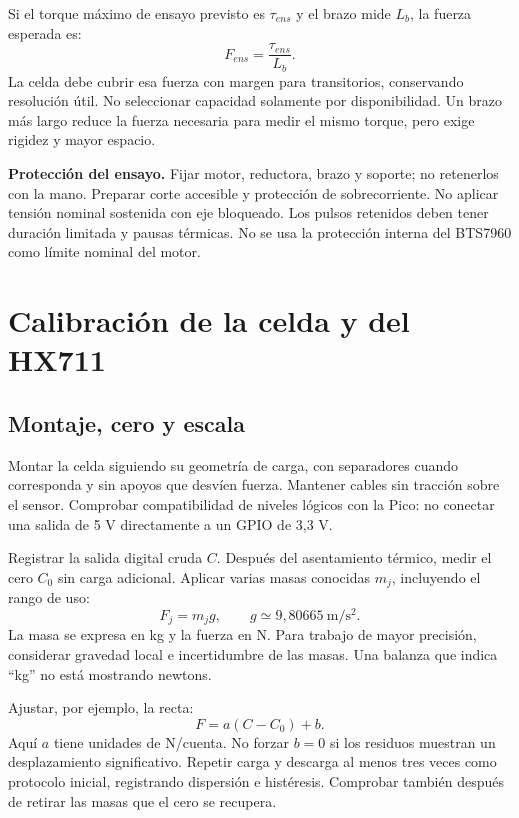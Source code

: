 \documentclass[11pt,a4paper]{article}
\begin{document}
Si el torque máximo de ensayo previsto es $\tau_{ens}$ y el brazo mide $L_b$, la fuerza esperada es:
\begin{equation}
F_{ens}=\frac{\tau_{ens}}{L_b}.
\end{equation}
La celda debe cubrir esa fuerza con margen para transitorios, conservando resolución útil. No seleccionar capacidad solamente por disponibilidad. Un brazo más largo reduce la fuerza necesaria para medir el mismo torque, pero exige rigidez y mayor espacio.

\textbf{Protección del ensayo.} Fijar motor, reductora, brazo y soporte; no retenerlos con la mano. Preparar corte accesible y protección de sobrecorriente. No aplicar tensión nominal sostenida con eje bloqueado. Los pulsos retenidos deben tener duración limitada y pausas térmicas. No se usa la protección interna del BTS7960 como límite nominal del motor.

\section{Calibración de la celda y del HX711}
\subsection{Montaje, cero y escala}
Montar la celda siguiendo su geometría de carga, con separadores cuando corresponda y sin apoyos que desvíen fuerza. Mantener cables sin tracción sobre el sensor. Comprobar compatibilidad de niveles lógicos con la Pico: no conectar una salida de 5 V directamente a un GPIO de 3,3 V.

Registrar la salida digital cruda $C$. Después del asentamiento térmico, medir el cero $C_0$ sin carga adicional. Aplicar varias masas conocidas $m_j$, incluyendo el rango de uso:
\begin{equation}
F_j=m_jg,\qquad g\simeq9{,}80665\ \mathrm{m/s^2}.
\end{equation}
La masa se expresa en kg y la fuerza en N. Para trabajo de mayor precisión, considerar gravedad local e incertidumbre de las masas. Una balanza que indica ``kg'' no está mostrando newtons.

Ajustar, por ejemplo, la recta:
\begin{equation}
F=a(C-C_0)+b.
\end{equation}
Aquí $a$ tiene unidades de N/cuenta. No forzar $b=0$ si los residuos muestran un desplazamiento significativo. Repetir carga y descarga al menos tres veces como protocolo inicial, registrando dispersión e histéresis. Comprobar también después de retirar las masas que el cero se recupera.
\end{document}
